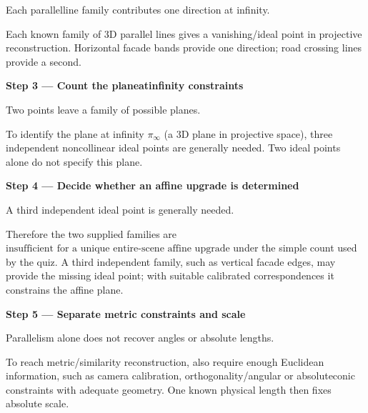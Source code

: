 \documentclass[letterpaper,11pt,english,openany,oneside]{jupyterBook}
\begin{document}
\sphinxAtStartPar
{} Each parallel\sphinxhyphen{}line family contributes one direction at infinity.

\sphinxAtStartPar
Each known family of 3D parallel lines gives a vanishing/ideal point in projective reconstruction. Horizontal facade bands provide one direction; road crossing lines provide a second.

\par

\par\medskip{}
{\color{QuizStepRed}\bfseries Step 3 — Count the plane\sphinxhyphen{}at\sphinxhyphen{}infinity constraints}\par\smallskip

\sphinxAtStartPar
{} Two points leave a family of possible planes.

\sphinxAtStartPar
To identify the plane at infinity {\color{QuizMathBlue} \(\pi_\infty\)} (a 3D plane in projective space), three independent noncollinear ideal points are generally needed. Two ideal points alone do not specify this plane.

\par

\par\medskip{}
{\color{QuizStepRed}\bfseries Step 4 — Decide whether an affine upgrade is determined}\par\smallskip

\sphinxAtStartPar
{} A third independent ideal point is generally needed.

\sphinxAtStartPar
Therefore the two supplied families are {\color{QuizMathBlue} \(\boxed{\text{insufficient for a unique entire-scene affine upgrade}}\)} under the simple count used by the quiz. A third independent family, such as vertical facade edges, may provide the missing ideal point; with suitable calibrated correspondences it constrains the affine plane.

\par

\par\medskip{}
{\color{QuizStepRed}\bfseries Step 5 — Separate metric constraints and scale}\par\smallskip

\sphinxAtStartPar
{} Parallelism alone does not recover angles or absolute lengths.

\sphinxAtStartPar
To reach metric/similarity reconstruction, also require enough Euclidean information, such as camera calibration, orthogonality/angular or absolute\sphinxhyphen{}conic constraints with adequate geometry. One known physical length then fixes absolute scale.
\end{document}
